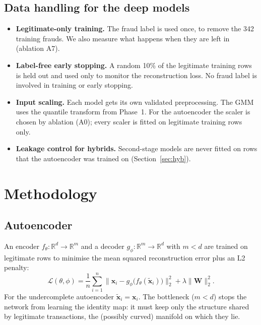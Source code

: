 \documentclass[12pt]{article}
\begin{document}
\subsection{Data handling for the deep models}
\begin{itemize}
\item \textbf{Legitimate-only training.} The fraud label is used once, to remove the 342 training frauds. We also
measure what happens when they are left in (ablation A7).
\item \textbf{Label-free early stopping.} A random 10\% of the legitimate training rows is held out and used only to
monitor the reconstruction loss. No fraud label is involved in training or early stopping.
\item \textbf{Input scaling.} Each model gets its own validated preprocessing. The GMM uses the quantile transform from
Phase~1. For the autoencoder the scaler is chosen by ablation (A0); every scaler is fitted on legitimate training rows
only.
\item \textbf{Leakage control for hybrids.} Second-stage models are never fitted on rows that the autoencoder was
trained on (Section~\ref{sec:hyb}).
\end{itemize}

\section{Methodology}\label{sec:method}

\subsection{Autoencoder}
An encoder $f_\theta:\mathbb{R}^d\rightarrow\mathbb{R}^m$ and a decoder $g_\phi:\mathbb{R}^m\rightarrow\mathbb{R}^d$ with
$m<d$ are trained on legitimate rows to minimise the mean squared reconstruction error plus an L2 penalty:
\begin{equation}
\mathcal{L}(\theta,\phi)=\frac1n\sum_{i=1}^{n}\big\lVert\mathbf{x}_i-g_\phi\big(f_\theta(\tilde{\mathbf{x}}_i)\big)\big\rVert_2^2+\lambda\lVert\mathbf{W}\rVert_2^2 .
\end{equation}
For the undercomplete autoencoder $\tilde{\mathbf{x}}_i=\mathbf{x}_i$. The bottleneck ($m<d$) stops the network from
learning the identity map: it must keep only the structure shared by legitimate transactions, the (possibly curved)
manifold on which they lie.
\end{document}
